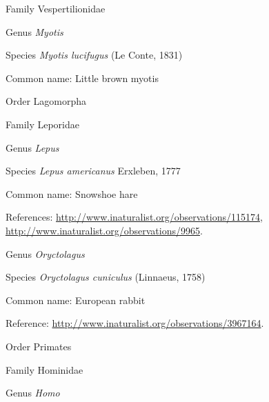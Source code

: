 \documentclass[9pt, article]{memoir}
\begin{document}
\begin{multicols}{2}
\vspace{6pt}\noindent\hspace{24pt}Family Vespertilionidae


\vspace{6pt}\noindent\hspace{30pt}Genus \textit{Myotis}


\vspace{6pt}\noindent\hspace{36pt}Species \textit{Myotis lucifugus} (Le Conte, 1831)


Common name: Little brown myotis

\vspace{6pt}\noindent\hspace{18pt}Order Lagomorpha


\vspace{6pt}\noindent\hspace{24pt}Family Leporidae


\vspace{6pt}\noindent\hspace{30pt}Genus \textit{Lepus}


\vspace{6pt}\noindent\hspace{36pt}Species \textit{Lepus americanus} Erxleben, 1777


Common name: Snowshoe hare

References: 
\url{http://www.inaturalist.org/observations/115174}, 
\url{http://www.inaturalist.org/observations/9965}.

\vspace{6pt}\noindent\hspace{30pt}Genus \textit{Oryctolagus}


\vspace{6pt}\noindent\hspace{36pt}Species \textit{Oryctolagus cuniculus} (Linnaeus, 1758)


Common name: European rabbit

Reference: 
\url{http://www.inaturalist.org/observations/3967164}.

\vspace{6pt}\noindent\hspace{18pt}Order Primates


\vspace{6pt}\noindent\hspace{24pt}Family Hominidae


\vspace{6pt}\noindent\hspace{30pt}Genus \textit{Homo}



\end{multicols}
\end{document}
